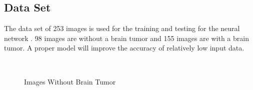 \documentclass[conference]{IEEEtran}
\begin{document}
\subsection{Data Set}
The data set of 253 images is used for the training and testing for the neural network \cite{b3}. 98 images are without a brain tumor and 155 images are with a brain tumor. A proper model will improve the accuracy of relatively low input data.
\begin{figure} [htb]
\centering 

\hfill
{} \hfill
{} \\
\hfill
{}\hfill
{}\hfill
\caption{\label{fig:samplesetup}Images Without Brain Tumor}


\end{figure}
\end{document}
